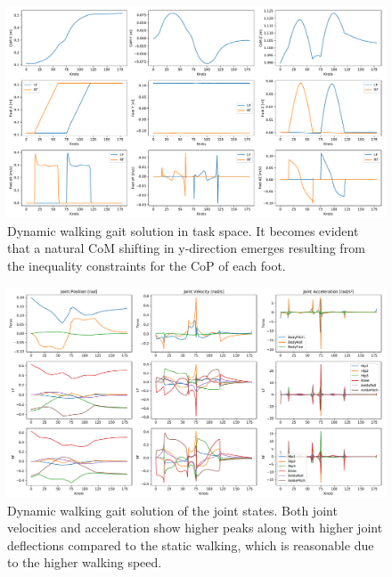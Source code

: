 \begin{figure}[h!]
\centering	
\includegraphics[width=1\textwidth]{fig/walkDynamic/TaskSpace}
\caption[Dynamic walking gait solution in task space]{Dynamic walking gait solution in task space. It becomes evident that a natural \gls{CoM} shifting in y-direction emerges resulting from the inequality constraints for the \gls{CoP} of each foot.}
\label{fig:walkDynamic_TaskSpace}
\end{figure} 

\begin{figure}[h!]
\centering	
\includegraphics[width=1\textwidth]{fig/walkDynamic/JointState}
\caption[Dynamic walking gait solution of the joint states.]{Dynamic walking gait solution of the joint states. Both joint velocities and acceleration show higher peaks along with higher joint deflections compared to the static walking, which is reasonable due to the higher walking speed.}
\label{fig:walkDynamic_JointState}
\end{figure} 



